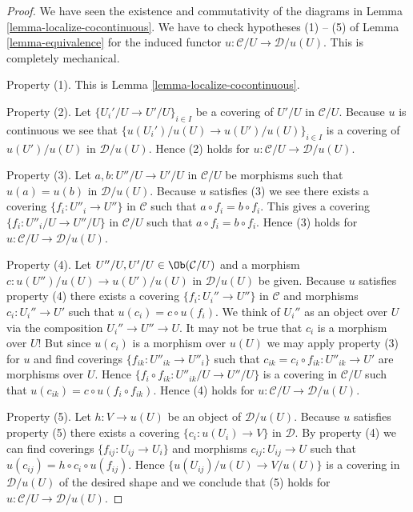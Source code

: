 \begin{proof}
We have seen the existence and commutativity of the diagrams in
Lemma \ref{lemma-localize-cocontinuous}. We have to check
hypotheses (1) -- (5) of Lemma \ref{lemma-equivalence} for the
induced functor $u : \mathcal{C}/U \to \mathcal{D}/u(U)$.
This is completely mechanical.

\medskip\noindent
Property (1). This is Lemma \ref{lemma-localize-cocontinuous}.

\medskip\noindent
Property (2). Let $\{U_i'/U \to U'/U\}_{i \in I}$ be a covering
of $U'/U$ in $\mathcal{C}/U$. Because $u$ is continuous we see that
$\{u(U_i')/u(U) \to u(U')/u(U)\}_{i \in I}$ is a covering
of $u(U')/u(U)$ in $\mathcal{D}/u(U)$. Hence (2) holds
for $u : \mathcal{C}/U \to \mathcal{D}/u(U)$.

\medskip\noindent
Property (3). Let $a, b : U''/U \to U'/U$ in $\mathcal{C}/U$
be morphisms such that $u(a) = u(b)$ in $\mathcal{D}/u(U)$.
Because $u$ satisfies (3) we see there exists a covering
$\{f_i : U''_i \to U''\}$ in $\mathcal{C}$ such that
$a \circ f_i = b \circ f_i$. This gives a covering
$\{f_i : U''_i/U \to U''/U\}$ in $\mathcal{C}/U$ such that
$a \circ f_i = b \circ f_i$. Hence (3) holds
for $u : \mathcal{C}/U \to \mathcal{D}/u(U)$.

\medskip\noindent
Property (4). Let $U''/U, U'/U \in \Ob(\mathcal{C}/U)$ and
a morphism $c : u(U'')/u(U) \to u(U')/u(U)$ in $\mathcal{D}/u(U)$
be given. Because $u$ satisfies property (4) there exists
a covering $\{f_i : U_i'' \to U''\}$ in $\mathcal{C}$
and morphisms $c_i : U_i'' \to U'$ such that $u(c_i) = c \circ u(f_i)$.
We think of $U_i''$ as an object over $U$ via the composition
$U_i'' \to U'' \to U$.
It may not be true that $c_i$ is a morphism over $U$!
But since $u(c_i)$ is a morphism over $u(U)$ we may apply
property (3) for $u$ and find coverings $\{f_{ik} : U''_{ik} \to U''_i\}$
such that $c_{ik} = c_i \circ f_{ik} : U''_{ik} \to U'$ are morphisms over $U$.
Hence $\{f_i \circ f_{ik} : U''_{ik}/U \to U''/U\}$ is a covering
in $\mathcal{C}/U$ such that $u(c_{ik}) = c \circ u(f_i \circ f_{ik})$.
Hence (4) holds
for $u : \mathcal{C}/U \to \mathcal{D}/u(U)$.

\medskip\noindent
Property (5). Let $h : V \to u(U)$ be an object of $\mathcal{D}/u(U)$.
Because $u$ satisfies property (5) there exists a covering
$\{c_i : u(U_i) \to V\}$ in $\mathcal{D}$. By property (4) we can find
coverings $\{f_{ij} : U_{ij} \to U_i\}$ and morphisms
$c_{ij} : U_{ij} \to U$ such that $u(c_{ij}) = h \circ c_i \circ u(f_{ij})$.
Hence $\{u(U_{ij})/u(U) \to V/u(U)\}$ is a covering in
$\mathcal{D}/u(U)$ of the desired shape and we conclude that
(5) holds for $u : \mathcal{C}/U \to \mathcal{D}/u(U)$.
\end{proof}


